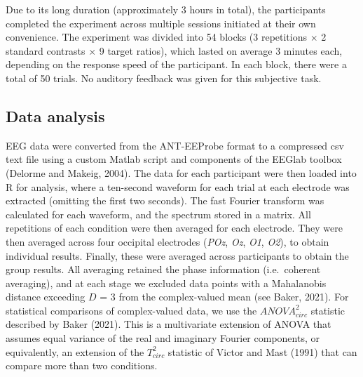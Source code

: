 \documentclass[
]{article}
\begin{document}
Due to its long duration (approximately 3 hours in total), the participants completed the experiment across multiple sessions initiated at their own convenience. The experiment was divided into 54 blocks (3 repetitions \(\times\) 2 standard contrasts \(\times\) 9 target ratios), which lasted on average 3 minutes each, depending on the response speed of the participant. In each block, there were a total of 50 trials. No auditory feedback was given for this subjective task.

\hypertarget{data-analysis}{%
\subsection{Data analysis}\label{data-analysis}}

EEG data were converted from the ANT-EEProbe format to a compressed csv text file using a custom Matlab script and components of the EEGlab toolbox (Delorme and Makeig, 2004). The data for each participant were then loaded into R for analysis, where a ten-second waveform for each trial at each electrode was extracted (omitting the first two seconds). The fast Fourier transform was calculated for each waveform, and the spectrum stored in a matrix. All repetitions of each condition were then averaged for each electrode. They were then averaged across four occipital electrodes (\emph{POz}, \emph{Oz}, \emph{O1}, \emph{O2}), to obtain individual results. Finally, these were averaged across participants to obtain the group results. All averaging retained the phase information (i.e.~coherent averaging), and at each stage we excluded data points with a Mahalanobis distance exceeding \(D\) = 3 from the complex-valued mean (see Baker, 2021). For statistical comparisons of complex-valued data, we use the \(ANOVA^2_{circ}\) statistic described by Baker (2021). This is a multivariate extension of ANOVA that assumes equal variance of the real and imaginary Fourier components, or equivalently, an extension of the \(T^2_{circ}\) statistic of Victor and Mast (1991) that can compare more than two conditions.
\end{document}
